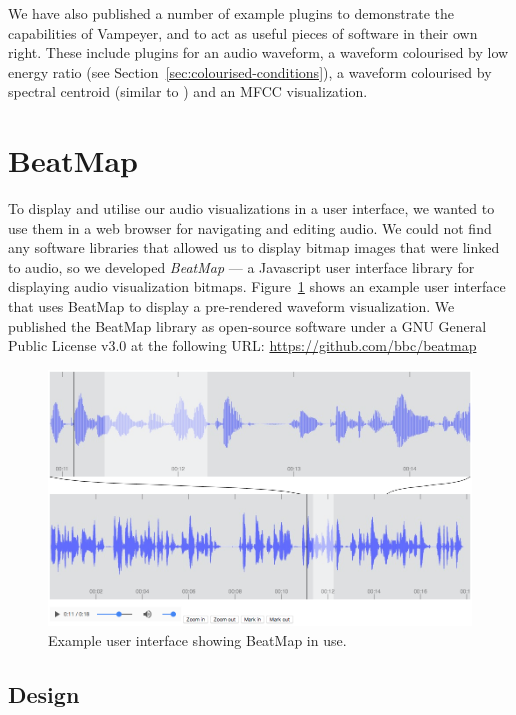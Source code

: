 We have also published a number of example plugins to demonstrate the capabilities of Vampeyer, and to act as
useful pieces of software in their own right.  These include plugins for an audio waveform, a waveform colourised by
low energy ratio (see Section~\ref{sec:colourised-conditions}), a waveform colourised by spectral centroid (similar to
\citet{Akkermans2011}) and an MFCC visualization.

\clearpage
\section{BeatMap}\label{sec:beatmap}

To display and utilise our audio visualizations in a user interface, we wanted to use them in a web browser for
navigating and editing audio. We could not find any software libraries that allowed us to display bitmap images that
were linked to audio, so we developed \textit{BeatMap} --- a Javascript user interface library for displaying audio
visualization bitmaps.  Figure~\ref{fig:beatmap} shows an example user interface that uses BeatMap to display a
pre-rendered waveform visualization.  We published the BeatMap library as open-source software under a GNU General
Public License v3.0 at the following URL: \url{https://github.com/bbc/beatmap}

\begin{figure}[h]
\centering
  \includegraphics[width=\textwidth]{figs/beatmap.png}
  \caption{Example user interface showing BeatMap in use.}
  \label{fig:beatmap}
\end{figure}

\subsection{Design}


